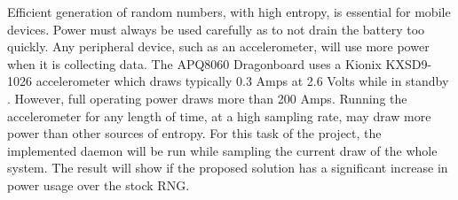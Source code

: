 
Efficient generation of random numbers, with high entropy, is essential 
for mobile devices.  Power must always be used carefully as to not drain 
the battery too quickly.  Any peripheral device, such as an 
accelerometer, will use more power when it is collecting data.  The 
APQ8060 Dragonboard uses a Kionix KXSD9-1026 accelerometer which draws 
typically 0.3 \mu Amps at 2.6 Volts while in standby \cite{Kionix}.  However, full 
operating power draws more than 200 \mu Amps.  Running the accelerometer 
for any length of time, at a high sampling rate, may draw more power 
than other sources of entropy.  For this task of the project, the 
implemented daemon will be run while sampling the current draw of the 
whole system.  The result will show if the proposed solution has a 
significant increase in power usage over the stock RNG.
